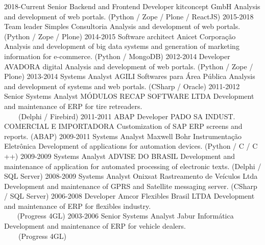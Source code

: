 \documentclass[]{src/twentysecondcv_en}
\begin{document}
\begin{twenty}
  \twentyitem
    {2018-Current}
    {Senior Backend and Frontend Developer}
    {kitconcept GmbH}
    {Analysis and development of web portals. (Python / Zope / Plone / ReactJS)}
  \twentyitem
    {2015-2018}
    {Team leader}
    {Simples Consultoria}
    {Analysis and development of web portals. (Python / Zope / Plone)}
  \twentyitem
    {2014-2015}
    {Software architect}
    {Anicet Corporação}
    {Analysis and development of big data systems and generation of marketing information for e-commerce. (Python / MongoDB)}
  \twentyitem
    {2012-2014}
    {Developer}
    {AVADORA digital}
    {Analysis and development of web portals. (Python / Zope / Plone)}
  \twentyitem
    {2013-2014}
    {Systems Analyst}
    {AGILI Softwares para Área Pública}
    {Analysis and development of systems and web portals. (CSharp / Oracle)}
  \twentyitem
    {2011-2012}
    {Senior Systems Analyst}
    {MÓDULOS RECAP SOFTWARE LTDA}
    {Development and maintenance of ERP for tire retreaders. \\
    (Delphi / Firebird)}
  \twentyitem
    {2011-2011}
    {ABAP Developer}
    {PADO SA INDUST. COMERCIAL E IMPORTADORA}
    {Customization of SAP ERP screens and reports. (ABAP)}
  \twentyitem
    {2009-2011}
    {Systems Analyst}
    {Maxwell Bohr Instrumentação Eletrônica}
    {Development of applications for automation devices. (Python / C / C ++)}
  \twentyitem
    {2009-2009}
    {Systems Analyst}
    {ADVISE DO BRASIL}
    {Development and maintenance of application for automated processing of electronic texts. (Delphi / SQL Server)}
  \twentyitem
    {2008-2009}
    {Systems Analyst}
    {Onixsat Rastreamento de Veículos Ltda}
    {Development and maintenance of GPRS and Satellite messaging server. (CSharp / SQL Server)}
  \twentyitem
    {2006-2008}
    {Developer}
    {Amcor Flexibles Brasil LTDA}
    {Development and maintenance of ERP for flexibles industry. \\
    (Progress 4GL)}
  \twentyitem
    {2003-2006}
    {Senior Systems Analyst}
    {Jabur Informática}
    {Development and maintenance of ERP for vehicle dealers. \\
    (Progress 4GL)}
\end{twenty}
\end{document}
